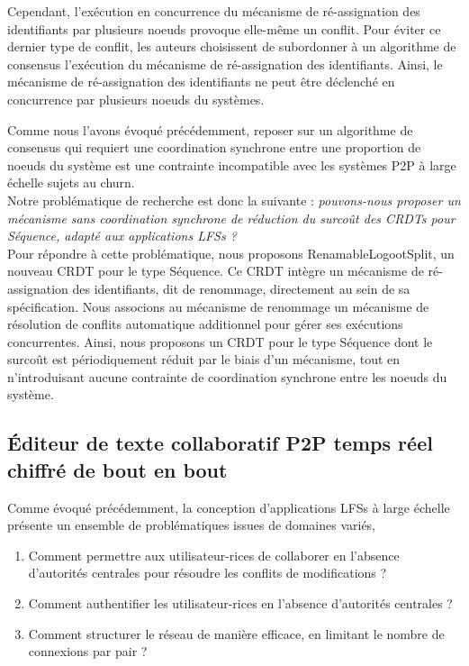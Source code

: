 Cependant, l'exécution en concurrence du mécanisme de ré-assignation des identifiants par plusieurs noeuds provoque elle-même un conflit.
Pour éviter ce dernier type de conflit, les auteurs choisissent de subordonner à un algorithme de consensus l'exécution du mécanisme de ré-assignation des identifiants.
Ainsi, le mécanisme de ré-assignation des identifiants ne peut être déclenché en concurrence par plusieurs noeuds du systèmes.

Comme nous l'avons évoqué précédemment, reposer sur un algorithme de consensus qui requiert une coordination synchrone entre une proportion de noeuds du système est une contrainte incompatible avec les systèmes \ac{P2P} à large échelle sujets au churn.\\

Notre problématique de recherche est donc la suivante : \emph{pouvons-nous proposer un mécanisme sans coordination synchrone de réduction du surcoût des \acp{CRDT} pour Séquence, \ie adapté aux applications \acp{LFS} ?}\\

Pour répondre à cette problématique, nous proposons RenamableLogootSplit, un nouveau \ac{CRDT} pour le type Séquence.
Ce \ac{CRDT} intègre un mécanisme de ré-assignation des identifiants, dit de renommage, directement au sein de sa spécification.
Nous associons au mécanisme de renommage un mécanisme de résolution de conflits automatique additionnel pour gérer ses exécutions concurrentes.
Ainsi, nous proposons un \ac{CRDT} pour le type Séquence dont le surcoût est périodiquement réduit par le biais d'un mécanisme, tout en n'introduisant aucune contrainte de coordination synchrone entre les noeuds du système.

\subsection{Éditeur de texte collaboratif \ac{P2P} temps réel chiffré de bout en bout}
\label{sec:research-questions-mute}

Comme évoqué précédemment, la conception d'applications \acp{LFS} à large échelle présente un ensemble de problématiques issues de domaines variés, \eg
\begin{enumerate}
    \item Comment permettre aux utilisateur-rices de collaborer en l'absence d'autorités centrales pour résoudre les conflits de modifications ?
    \item Comment authentifier les utilisateur-rices en l'absence d'autorités centrales ?
    \item Comment structurer le réseau de manière efficace, \ie en limitant le nombre de connexions par pair ?
\end{enumerate}

